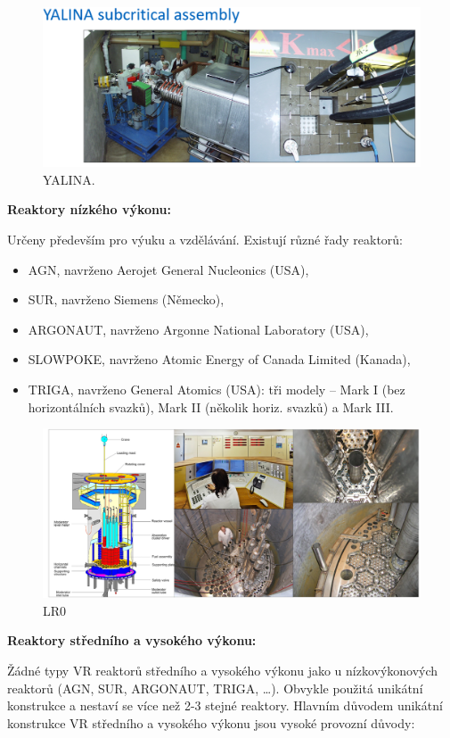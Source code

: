 \begin{figure}
    \centering
    \includegraphics[width=0.75\linewidth]{img/YALINA.png}
    \caption{YALINA.}
    \label{fig:enter-label}
\end{figure}


\textbf{Reaktory nízkého výkonu:}

Určeny především pro výuku a vzdělávání. Existují různé řady reaktorů:

\begin{itemize}
    \item AGN, navrženo Aerojet General Nucleonics (USA),
    \item SUR, navrženo Siemens (Německo),
    \item ARGONAUT, navrženo Argonne National Laboratory (USA),
    \item SLOWPOKE, navrženo Atomic Energy of Canada Limited (Kanada),
    \item TRIGA, navrženo General Atomics (USA): tři modely -- Mark I (bez horizontálních svazků), Mark II (několik horiz. svazků) a Mark III. 
\end{itemize}

\begin{figure}[H]
    \centering
    \includegraphics[width=0.75\linewidth]{img/LR0.png}
    \caption{LR0}
    \label{fig:enter-label}
\end{figure}

\textbf{Reaktory středního a vysokého výkonu:}

Žádné typy VR reaktorů středního a vysokého výkonu jako u nízkovýkonových reaktorů (AGN, SUR, ARGONAUT, TRIGA, …). Obvykle použitá unikátní konstrukce a nestaví se více než 2-3 stejné reaktory. Hlavním důvodem unikátní konstrukce VR středního a vysokého výkonu jsou vysoké provozní důvody:

